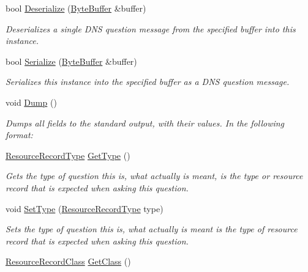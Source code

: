 \begin{DoxyCompactItemize}
bool \hyperlink{class_senergy_1_1_dns_1_1_message_question_a1c66b45b448f262a4f2cf1317c89b5b3}{Deserialize} (\hyperlink{class_senergy_1_1_byte_buffer}{Byte\-Buffer} \&buffer)
\begin{DoxyCompactList}\small\item\em Deserializes a single D\-N\-S question message from the specified buffer into this instance. \end{DoxyCompactList}\item 
bool \hyperlink{class_senergy_1_1_dns_1_1_message_question_a60772687d382e1d376852e1b5ff59968}{Serialize} (\hyperlink{class_senergy_1_1_byte_buffer}{Byte\-Buffer} \&buffer)
\begin{DoxyCompactList}\small\item\em Serializes this instance into the specified buffer as a D\-N\-S question message. \end{DoxyCompactList}\item 
void \hyperlink{class_senergy_1_1_dns_1_1_message_question_a7ac084601ff3285c6e47e7ce7ccc09cf}{Dump} ()
\begin{DoxyCompactList}\small\item\em Dumps all fields to the standard output, with their values. In the following format\-: \end{DoxyCompactList}\item 
\hyperlink{namespace_senergy_1_1_dns_a590bfd748c955364770f5ce358d9dfe0}{Resource\-Record\-Type} \hyperlink{class_senergy_1_1_dns_1_1_message_question_a66d9d051672d30c1f4b5663d25430ec8}{Get\-Type} ()
\begin{DoxyCompactList}\small\item\em Gets the type of question this is, what actually is meant, is the type or resource record that is expected when asking this question. \end{DoxyCompactList}\item 
void \hyperlink{class_senergy_1_1_dns_1_1_message_question_a3fbcbad88592bf5cde58c7b22119cc4f}{Set\-Type} (\hyperlink{namespace_senergy_1_1_dns_a590bfd748c955364770f5ce358d9dfe0}{Resource\-Record\-Type} type)
\begin{DoxyCompactList}\small\item\em Sets the type of question this is, what actually is meant is the type of resource record that is expected when asking this question. \end{DoxyCompactList}\item 
\hyperlink{namespace_senergy_1_1_dns_a953f153bc411213d621d00c1e1b3eb9d}{Resource\-Record\-Class} \hyperlink{class_senergy_1_1_dns_1_1_message_question_ae86936e1268d7abf0a2210df9caa0840}{Get\-Class} ()

\end{DoxyCompactItemize}
